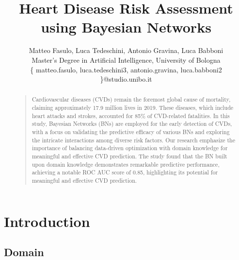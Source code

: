 \documentclass[letterpaper]{article}
\begin{document}
%
\title{Heart Disease Risk Assessment using Bayesian Networks}
\author{Matteo Fasulo, Luca Tedeschini, Antonio Gravina, Luca Babboni\\
Master's Degree in Artificial Intelligence, University of Bologna\\
\{ matteo.fasulo, luca.tedeschini3, antonio.gravina, luca.babboni2 \}@studio.unibo.it
}

\maketitle



\begin{abstract}
\begin{quote}


Cardiovascular diseases (CVDs) remain the foremost global cause of mortality, claiming approximately 17.9 million lives in 2019. These diseases, which include heart attacks and strokes, accounted for 85\% of CVD-related fatalities. 
In this study, Bayesian Networks (BNs) are employed for the early detection of CVDs, with a focus on validating the predictive efficacy of various BNs and exploring the intricate interactions among diverse risk factors. Our research emphasize the importance of balancing data-driven optimization with domain knowledge for meaningful and effective CVD prediction. The study found that the BN built upon domain knowledge demonstrates remarkable predictive performance, achieving a notable ROC AUC score of 0.85, highlighting its potential for meaningful and effective CVD prediction.
\end{quote}
\end{abstract}

\section{Introduction}
\subsection{Domain}
\end{document}
